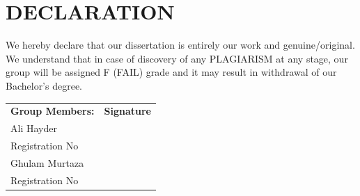 \chapter*{DECLARATION}

We hereby declare that our dissertation is entirely our work and genuine/original. We understand that in case of discovery of any PLAGIARISM at any stage, our group will be assigned F (FAIL) grade and it may result in withdrawal of our Bachelor's degree.\\[1.5cm]

\noindent
\begin{tabular}{@{}p{}p{}@{}}
\textbf{Group Members:} & \textbf{Signature} \\[1.2cm]
Ali Hayder           & \underline{\hspace{5cm}} \\[0.3cm]
Registration No      & \underline{\hspace{5cm}} \\[1.2cm]
Ghulam Murtaza       & \underline{\hspace{5cm}} \\[0.3cm]
Registration No      & \underline{\hspace{5cm}} \\
\end{tabular}

\clearpage
